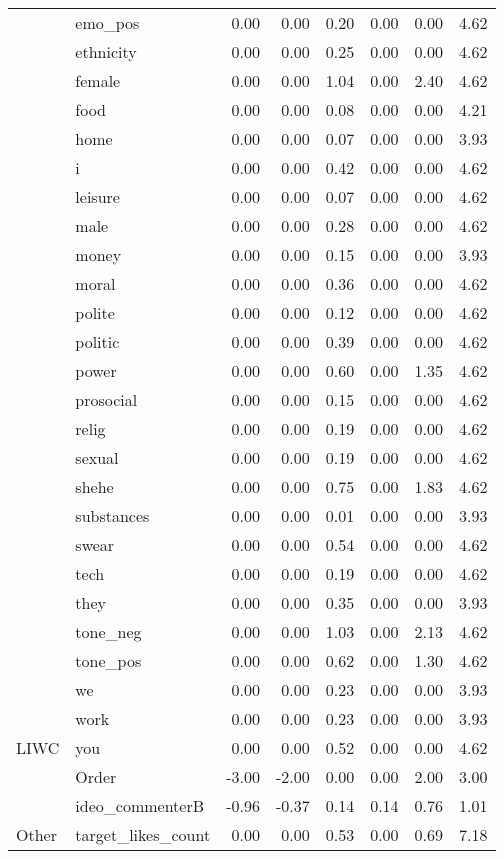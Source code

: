 \begin{table}[!h]
\begin{tabular}[t]{l|l|r|r|r|r|r|r}
\cline{2-8}
 & emo\_pos & 0.00 & 0.00 & 0.20 & 0.00 & 0.00 & 4.62\\
\cline{2-8}
 & ethnicity & 0.00 & 0.00 & 0.25 & 0.00 & 0.00 & 4.62\\
\cline{2-8}
 & female & 0.00 & 0.00 & 1.04 & 0.00 & 2.40 & 4.62\\
\cline{2-8}
 & food & 0.00 & 0.00 & 0.08 & 0.00 & 0.00 & 4.21\\
\cline{2-8}
 & home & 0.00 & 0.00 & 0.07 & 0.00 & 0.00 & 3.93\\
\cline{2-8}
 & i & 0.00 & 0.00 & 0.42 & 0.00 & 0.00 & 4.62\\
\cline{2-8}
 & leisure & 0.00 & 0.00 & 0.07 & 0.00 & 0.00 & 4.62\\
\cline{2-8}
 & male & 0.00 & 0.00 & 0.28 & 0.00 & 0.00 & 4.62\\
\cline{2-8}
 & money & 0.00 & 0.00 & 0.15 & 0.00 & 0.00 & 3.93\\
\cline{2-8}
 & moral & 0.00 & 0.00 & 0.36 & 0.00 & 0.00 & 4.62\\
\cline{2-8}
 & polite & 0.00 & 0.00 & 0.12 & 0.00 & 0.00 & 4.62\\
\cline{2-8}
 & politic & 0.00 & 0.00 & 0.39 & 0.00 & 0.00 & 4.62\\
\cline{2-8}
 & power & 0.00 & 0.00 & 0.60 & 0.00 & 1.35 & 4.62\\
\cline{2-8}
 & prosocial & 0.00 & 0.00 & 0.15 & 0.00 & 0.00 & 4.62\\
\cline{2-8}
 & relig & 0.00 & 0.00 & 0.19 & 0.00 & 0.00 & 4.62\\
\cline{2-8}
 & sexual & 0.00 & 0.00 & 0.19 & 0.00 & 0.00 & 4.62\\
\cline{2-8}
 & shehe & 0.00 & 0.00 & 0.75 & 0.00 & 1.83 & 4.62\\
\cline{2-8}
 & substances & 0.00 & 0.00 & 0.01 & 0.00 & 0.00 & 3.93\\
\cline{2-8}
 & swear & 0.00 & 0.00 & 0.54 & 0.00 & 0.00 & 4.62\\
\cline{2-8}
 & tech & 0.00 & 0.00 & 0.19 & 0.00 & 0.00 & 4.62\\
\cline{2-8}
 & they & 0.00 & 0.00 & 0.35 & 0.00 & 0.00 & 3.93\\
\cline{2-8}
 & tone\_neg & 0.00 & 0.00 & 1.03 & 0.00 & 2.13 & 4.62\\
\cline{2-8}
 & tone\_pos & 0.00 & 0.00 & 0.62 & 0.00 & 1.30 & 4.62\\
\cline{2-8}
 & we & 0.00 & 0.00 & 0.23 & 0.00 & 0.00 & 3.93\\
\cline{2-8}
 & work & 0.00 & 0.00 & 0.23 & 0.00 & 0.00 & 3.93\\
\cline{2-8}
\multirow{-33}{*}{\raggedright\arraybackslash LIWC} & you & 0.00 & 0.00 & 0.52 & 0.00 & 0.00 & 4.62\\
\cline{1-8}
 & Order & -3.00 & -2.00 & 0.00 & 0.00 & 2.00 & 3.00\\
\cline{2-8}
 & ideo\_commenterB & -0.96 & -0.37 & 0.14 & 0.14 & 0.76 & 1.01\\
\cline{2-8}
\multirow{-3}{*}{\raggedright\arraybackslash Other} & target\_likes\_count & 0.00 & 0.00 & 0.53 & 0.00 & 0.69 & 7.18\\
\hline
\end{tabular}
\end{table}
